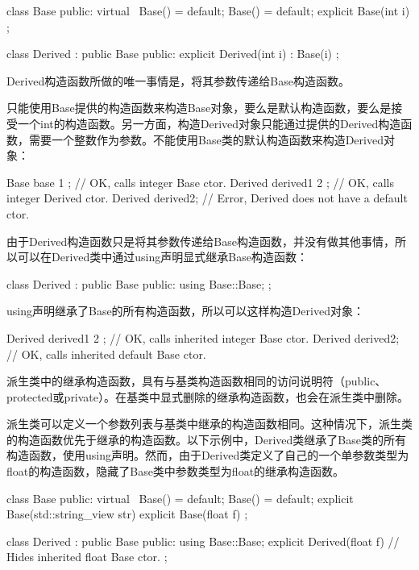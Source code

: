 \begin{cpp}
class Base
{
    public:
        virtual ~Base() = default;
        Base() = default;
        explicit Base(int i) {}
};

class Derived : public Base
{
    public:
        explicit Derived(int i) : Base(i) {}
};
\end{cpp}

Derived构造函数所做的唯一事情是，将其参数传递给Base构造函数。

只能使用Base提供的构造函数来构造Base对象，要么是默认构造函数，要么是接受一个int的构造函数。另一方面，构造Derived对象只能通过提供的Derived构造函数，需要一个整数作为参数。不能使用Base类的默认构造函数来构造Derived对象：

\begin{cpp}
Base base { 1 }; // OK, calls integer Base ctor.
Derived derived1 { 2 }; // OK, calls integer Derived ctor.
Derived derived2; // Error, Derived does not have a default ctor.
\end{cpp}

由于Derived构造函数只是将其参数传递给Base构造函数，并没有做其他事情，所以可以在Derived类中通过using声明显式继承Base构造函数：

\begin{cpp}
class Derived : public Base
{
    public:
        using Base::Base;
};
\end{cpp}

using声明继承了Base的所有构造函数，所以可以这样构造Derived对象：

\begin{cpp}
Derived derived1 { 2 }; // OK, calls inherited integer Base ctor.
Derived derived2; // OK, calls inherited default Base ctor.
\end{cpp}

派生类中的继承构造函数，具有与基类构造函数相同的访问说明符（public、protected或private）。在基类中显式删除的继承构造函数，也会在派生类中删除。


派生类可以定义一个参数列表与基类中继承的构造函数相同。这种情况下，派生类的构造函数优先于继承的构造函数。以下示例中，Derived类继承了Base类的所有构造函数，使用using声明。然而，由于Derived类定义了自己的一个单参数类型为float的构造函数，隐藏了Base类中参数类型为float的继承构造函数。

\begin{cpp}
class Base
{
    public:
        virtual ~Base() = default;
        Base() = default;
        explicit Base(std::string_view str) {}
        explicit Base(float f) {}
};

class Derived : public Base
{
    public:
        using Base::Base;
        explicit Derived(float f) {} // Hides inherited float Base ctor.
};
\end{cpp}

